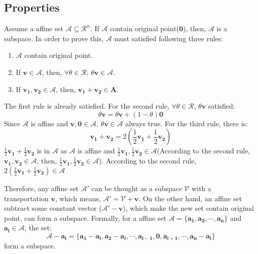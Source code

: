 \documentclass[10pt,a4paper]{article}
\begin{document}
\subsection{Properties}
Assume a affine set $\mathcal{A} \subseteq \mathcal{R}^{n}$. If $\mathcal{A}$ contain original point($\mathbf{0}$), then, $\mathcal{A}$ is a subspace. In order to prove this, $\mathcal{A}$ must satisfied following three rules:  
\begin{enumerate}
	\item $\mathcal{A}$ contain original point.
	\item If $\mathbf{v} \in \mathcal{A}$, then, $\forall \theta \in \mathcal{R}$, $\theta \mathbf{v} \in \mathcal{A}$.
	\item If $\mathbf{v_{1}}, \mathbf{v_{2}} \in \mathcal{A}$, then, $\mathbf{v_{1}} + \mathbf{v_{2}} \in \mathbf{A}$.
\end{enumerate}
The first rule is already satisfied. For the second rule, $\forall \theta \in \mathcal{R}$, $\theta \mathbf{v}$ satisfied:
\begin{equation*}
	\theta \mathbf{v} = \theta \mathbf{v} + (1 - \theta) \mathbf{0}
\end{equation*}
Since $\mathcal{A}$ is affine and $\mathbf{v}, \mathbf{0} \in \mathcal{A}$, $\theta \mathbf{v} \in \mathcal{A}$ always true. For the third rule, there is:
\begin{equation*}
	\mathbf{v_{1}} + \mathbf{v_{2}} = 2(\frac{1}{2} \mathbf{v_{1}} + \frac{1}{2} \mathbf{v_{2}})
\end{equation*}
$\frac{1}{2} \mathbf{v_{1}} + \frac{1}{2} \mathbf{v_{2}}$ is in $\mathcal{A}$ as $\mathcal{A}$ is affine and $\frac{1}{2} \mathbf{v_{1}}, \frac{1}{2} \mathbf{v_{2}} \in \mathcal{A}$(According to the second rule, $\mathbf{v_{1}}, \mathbf{v_{2}} \in \mathcal{A}$, then, $\frac{1}{2} \mathbf{v_{1}}, \frac{1}{2} \mathbf{v_{2}} \in \mathcal{A}$). According  to the second rule, $2(\frac{1}{2} \mathbf{v_{1}} + \frac{1}{2} \mathbf{v_{2}}) \in \mathcal{A}$

Therefore, any affine set $\mathcal{A}'$ can be thought as a subspace $\mathcal{V}$ with a transportation $\mathbf{v}$, which means, $\mathcal{A}' = \mathcal{V} + \mathbf{v}$. On the other hand, an affine set subtract some constant vector ($\mathcal{A}' - \mathbf{v}$), which make the new set contain original point, can form a subspace. Formally, for a affine set $\mathcal{A} = \{ \mathbf{a_{1}}, \mathbf{a_{2}}, \cdots, \mathbf{a_{n}} \}$ and  $\mathbf{a_{i}} \in \mathcal{A}$, the set:
\begin{equation*}
	\mathcal{A} - \mathbf{a_{i}} = \{ \mathbf{a_{1}} - \mathbf{a_{i}}, \mathbf{a_{2}} - \mathbf{a_{i}}, \cdots,  \mathbf{a_{i - 1}}, \mathbf{0}, \mathbf{a_{i + 1}}, \cdots, \mathbf{a_{n}} - \mathbf{a_{i}} \}
\end{equation*}
form a subspace.
\end{document}
